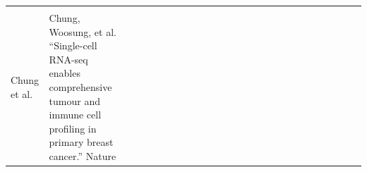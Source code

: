 \documentclass[12pt,]{book}
\theoremstyle{definition}
\theoremstyle{definition}
\theoremstyle{definition}
\theoremstyle{remark}
\begin{document}
\begin{longtable}[]{@{}llllllllllllllllllllllllll@{}}
\begin{minipage}[t]{0.00\columnwidth}
\strut
\end{minipage} & \begin{minipage}[t]{0.00\columnwidth}\raggedright
\strut
\end{minipage} & \begin{minipage}[t]{0.00\columnwidth}\raggedright
\strut
\end{minipage} & \begin{minipage}[t]{0.00\columnwidth}\raggedright
\strut
\end{minipage} & \begin{minipage}[t]{0.00\columnwidth}\raggedright
\strut
\end{minipage} & \begin{minipage}[t]{0.00\columnwidth}\raggedright
\strut
\end{minipage} & \begin{minipage}[t]{0.00\columnwidth}\raggedright
\strut
\end{minipage} & \begin{minipage}[t]{0.00\columnwidth}\raggedright
\strut
\end{minipage} & \begin{minipage}[t]{0.00\columnwidth}\raggedright
\strut
\end{minipage} & \begin{minipage}[t]{0.00\columnwidth}\raggedright
\strut
\end{minipage} & \begin{minipage}[t]{0.00\columnwidth}\raggedright
\strut
\end{minipage} & \begin{minipage}[t]{0.00\columnwidth}\raggedright
\strut
\end{minipage} & \begin{minipage}[t]{0.00\columnwidth}\raggedright
\strut
\end{minipage} & \begin{minipage}[t]{0.00\columnwidth}\raggedright
\strut
\end{minipage} & \begin{minipage}[t]{0.00\columnwidth}\raggedright
\strut
\end{minipage}\tabularnewline
\begin{minipage}[t]{0.01\columnwidth}\raggedright
Chung et al.\strut
\end{minipage} & \begin{minipage}[t]{0.06\columnwidth}\raggedright
Chung, Woosung, et al. ``Single-cell RNA-seq enables comprehensive
tumour and immune cell profiling in primary breast cancer.'' Nature

\end{minipage}
\end{longtable}
\end{document}
